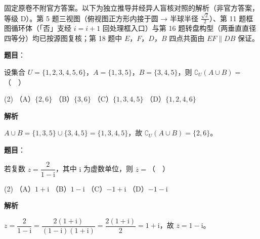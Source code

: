 

\begin{gktip}
固定原卷不附官方答案。以下为独立推导并经异人盲核对照的解析（非官方答案，等级 D）。第 5 题三视图（俯视图正方形内接于圆 → 半球半径 \(\frac{\sqrt2}{2}\)）、第 11 题框图循环体（「否」支经 \(i=i+1\) 回处理框入口）与第 16 题转盘构型（两垂直直径四等分）均已按源图复核；第 18 题中 \(E\)，\(F\)，\(D\)，\(B\) 四点共面由 \(EF\parallel DB\) 保证。
\end{gktip}

\begin{answer}

\textbf{题目}：

设集合 \(U=\{1,2,3,4,5,6\}\)，\(A=\{1,3,5\}\)，\(B=\{3,4,5\}\)，则 \(\complement_U(A\cup B)=\)（　）

\begin{gkopts}(2)
\task （A）\(\{2,6\}\)
\task （B）\(\{3,6\}\)
\task （C）\(\{1,3,4,5\}\)
\task （D）\(\{1,2,4,6\}\)
\end{gkopts}

\textbf{解析}

\(A\cup B=\{1,3,5\}\cup\{3,4,5\}=\{1,3,4,5\}\)，故 \(\complement_U(A\cup B)=\{2,6\}\)。


\end{answer}
\begin{answer}

\textbf{题目}：

若复数 \(z=\dfrac{2}{1-\mathrm{i}}\)，其中 \(\mathrm{i}\) 为虚数单位，则 \(\overline{z}=\)（　）

\begin{gkopts}(2)
\task （A）\(1+\mathrm{i}\)
\task （B）\(1-\mathrm{i}\)
\task （C）\(-1+\mathrm{i}\)
\task （D）\(-1-\mathrm{i}\)
\end{gkopts}

\textbf{解析}

\(z=\dfrac{2}{1-\mathrm{i}}=\dfrac{2(1+\mathrm{i})}{(1-\mathrm{i})(1+\mathrm{i})}=\dfrac{2(1+\mathrm{i})}{2}=1+\mathrm{i}\)，故 \(\overline{z}=1-\mathrm{i}\)。


\end{answer}
